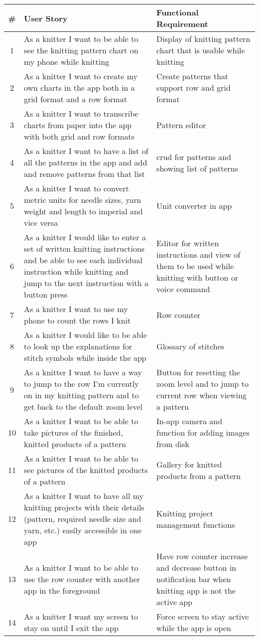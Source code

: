 \label{tabl:requirements}
\begin{longtable}{| c | p{6.5cm} | p{6.5cm} |}
    \hline
   	\# & User Story & Functional Requirement \\ \hline
   	\endhead
    1 &	As a knitter I want to be able to see the knitting pattern chart on my phone while knitting &
	 Display of knitting pattern chart that is usable while knitting \\ \hline
	2 & As a knitter I want to create my own charts in the app both in a grid format and a row format & Create patterns that support row and grid format \\ \hline
	3 & As a knitter I want to transcribe charts from paper into the app with both grid and row formats & Pattern editor \\ \hline
	4 & As a knitter I want to have a list of all the patterns in the app and add and remove patterns from that list & \gls{crud} for patterns and showing list of patterns\\ \hline
	5 & As a knitter I want to convert metric units for needle sizes, yarn weight and length to imperial and vice versa & Unit converter in app  \\ \hline
	6 & As a knitter I would like to enter a set of written knitting instructions and be able to see each individual instruction while knitting and jump to the next instruction with a button press & Editor for written instructions and view of them to be used while knitting with button or voice command \\ \hline
	7 & As a knitter I want to use my phone to count the rows I knit & Row counter \\ \hline
	8 & As a knitter I would like to be able to look up the explanations for stitch symbols while inside the app & Glossary of stitches \\ \hline
	9 & As a knitter I want to have a way to jump to the row I'm currently on in my knitting pattern and to get back to the default zoom level & Button for resetting the zoom level and to jump to current row when viewing a pattern \\ \hline
	10 & As a knitter I want to be able to take pictures of the finished, knitted products of a pattern & In-app camera and function for adding images from disk \\ \hline
	11 & As a knitter I want to be able to see pictures of the knitted products of a pattern & Gallery for knitted products from a pattern \\ \hline
	12 & As a knitter I want to have all my knitting projects with their details (pattern, required needle size and yarn, etc.) easily accessible in one app & Knitting project management functions  \\ \hline
	13 & As a knitter I want to be able to use the row counter with another app in the foreground &  Have row counter increase and decrease button in notification bar when knitting app is not the active app \\ \hline
	14 & As a knitter I want my screen to stay on until I exit the app & Force screen to stay active while the app is open \\ \hline
\end{longtable}

